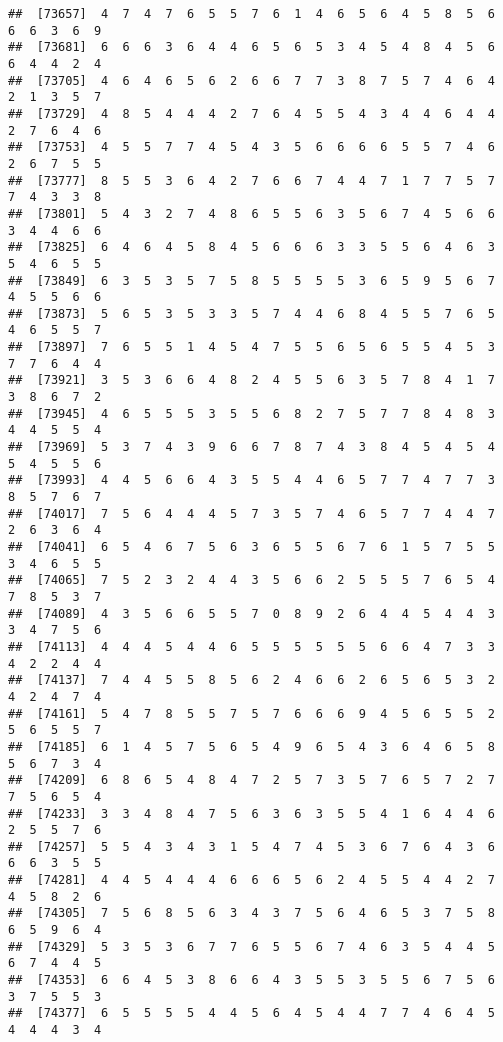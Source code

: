 \documentclass[
]{book}
\begin{document}
\begin{verbatim}
##  [73657]  4  7  4  7  6  5  5  7  6  1  4  6  5  6  4  5  8  5  6  6  6  3  6  9
##  [73681]  6  6  6  3  6  4  4  6  5  6  5  3  4  5  4  8  4  5  6  6  4  4  2  4
##  [73705]  4  6  4  6  5  6  2  6  6  7  7  3  8  7  5  7  4  6  4  2  1  3  5  7
##  [73729]  4  8  5  4  4  4  2  7  6  4  5  5  4  3  4  4  6  4  4  2  7  6  4  6
##  [73753]  4  5  5  7  7  4  5  4  3  5  6  6  6  6  5  5  7  4  6  2  6  7  5  5
##  [73777]  8  5  5  3  6  4  2  7  6  6  7  4  4  7  1  7  7  5  7  7  4  3  3  8
##  [73801]  5  4  3  2  7  4  8  6  5  5  6  3  5  6  7  4  5  6  6  3  4  4  6  6
##  [73825]  6  4  6  4  5  8  4  5  6  6  6  3  3  5  5  6  4  6  3  5  4  6  5  5
##  [73849]  6  3  5  3  5  7  5  8  5  5  5  5  3  6  5  9  5  6  7  4  5  5  6  6
##  [73873]  5  6  5  3  5  3  3  5  7  4  4  6  8  4  5  5  7  6  5  4  6  5  5  7
##  [73897]  7  6  5  5  1  4  5  4  7  5  5  6  5  6  5  5  4  5  3  7  7  6  4  4
##  [73921]  3  5  3  6  6  4  8  2  4  5  5  6  3  5  7  8  4  1  7  3  8  6  7  2
##  [73945]  4  6  5  5  5  3  5  5  6  8  2  7  5  7  7  8  4  8  3  4  4  5  5  4
##  [73969]  5  3  7  4  3  9  6  6  7  8  7  4  3  8  4  5  4  5  4  5  4  5  5  6
##  [73993]  4  4  5  6  6  4  3  5  5  4  4  6  5  7  7  4  7  7  3  8  5  7  6  7
##  [74017]  7  5  6  4  4  4  5  7  3  5  7  4  6  5  7  7  4  4  7  2  6  3  6  4
##  [74041]  6  5  4  6  7  5  6  3  6  5  5  6  7  6  1  5  7  5  5  3  4  6  5  5
##  [74065]  7  5  2  3  2  4  4  3  5  6  6  2  5  5  5  7  6  5  4  7  8  5  3  7
##  [74089]  4  3  5  6  6  5  5  7  0  8  9  2  6  4  4  5  4  4  3  3  4  7  5  6
##  [74113]  4  4  4  5  4  4  6  5  5  5  5  5  5  6  6  4  7  3  3  4  2  2  4  4
##  [74137]  7  4  4  5  5  8  5  6  2  4  6  6  2  6  5  6  5  3  2  4  2  4  7  4
##  [74161]  5  4  7  8  5  5  7  5  7  6  6  6  9  4  5  6  5  5  2  5  6  5  5  7
##  [74185]  6  1  4  5  7  5  6  5  4  9  6  5  4  3  6  4  6  5  8  5  6  7  3  4
##  [74209]  6  8  6  5  4  8  4  7  2  5  7  3  5  7  6  5  7  2  7  7  5  6  5  4
##  [74233]  3  3  4  8  4  7  5  6  3  6  3  5  5  4  1  6  4  4  6  2  5  5  7  6
##  [74257]  5  5  4  3  4  3  1  5  4  7  4  5  3  6  7  6  4  3  6  6  6  3  5  5
##  [74281]  4  4  5  4  4  4  6  6  6  5  6  2  4  5  5  4  4  2  7  4  5  8  2  6
##  [74305]  7  5  6  8  5  6  3  4  3  7  5  6  4  6  5  3  7  5  8  6  5  9  6  4
##  [74329]  5  3  5  3  6  7  7  6  5  5  6  7  4  6  3  5  4  4  5  6  7  4  4  5
##  [74353]  6  6  4  5  3  8  6  6  4  3  5  5  3  5  5  6  7  5  6  3  7  5  5  3
##  [74377]  6  5  5  5  5  4  4  5  6  4  5  4  4  7  7  4  6  4  5  4  4  4  3  4

\end{verbatim}
\end{document}

